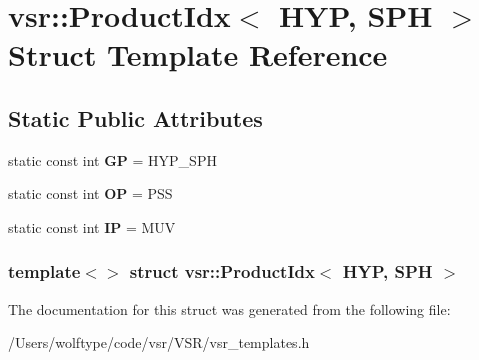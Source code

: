 \hypertarget{structvsr_1_1_product_idx_3_01_h_y_p_00_01_s_p_h_01_4}{\section{vsr\-:\-:Product\-Idx$<$ H\-Y\-P, S\-P\-H $>$ Struct Template Reference}
\label{structvsr_1_1_product_idx_3_01_h_y_p_00_01_s_p_h_01_4}
}
\subsection*{Static Public Attributes}
\begin{DoxyCompactItemize}
\item 
\hypertarget{structvsr_1_1_product_idx_3_01_h_y_p_00_01_s_p_h_01_4_a94467478c38a329d7223d5364441ead0}{static const int {\bfseries G\-P} = H\-Y\-P\-\_\-\-S\-P\-H}\label{structvsr_1_1_product_idx_3_01_h_y_p_00_01_s_p_h_01_4_a94467478c38a329d7223d5364441ead0}

\item 
\hypertarget{structvsr_1_1_product_idx_3_01_h_y_p_00_01_s_p_h_01_4_ad01aacb78ea5cb651a68d406b6392966}{static const int {\bfseries O\-P} = P\-S\-S}\label{structvsr_1_1_product_idx_3_01_h_y_p_00_01_s_p_h_01_4_ad01aacb78ea5cb651a68d406b6392966}

\item 
\hypertarget{structvsr_1_1_product_idx_3_01_h_y_p_00_01_s_p_h_01_4_a1283c54f7863548819f506460c71bd94}{static const int {\bfseries I\-P} = M\-U\-V}\label{structvsr_1_1_product_idx_3_01_h_y_p_00_01_s_p_h_01_4_a1283c54f7863548819f506460c71bd94}

\end{DoxyCompactItemize}
\subsubsection*{template$<$$>$ struct vsr\-::\-Product\-Idx$<$ H\-Y\-P, S\-P\-H $>$}



The documentation for this struct was generated from the following file\-:\begin{DoxyCompactItemize}
\item 
/\-Users/wolftype/code/vsr/\-V\-S\-R/vsr\-\_\-templates.\-h\end{DoxyCompactItemize}
